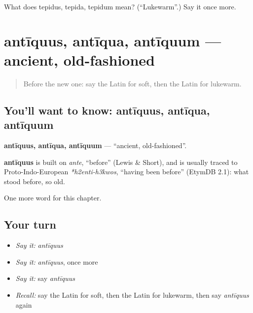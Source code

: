 \begin{tcolorbox}[breakable,colback=teal!4,colframe=teal!35!black,title={Before you move on}]
What does tepidus, tepida, tepidum mean? (\textquotedblleft{}Lukewarm\textquotedblright{}.) Say it once more.
\end{tcolorbox}
\section[antīquus, antīqua, antīquum]{antīquus, antīqua, antīquum — ancient, old-fashioned}

\label{lesson:LA-C143-antiquus}



\begin{quote}
Before the new one: say the Latin for soft, then the Latin for lukewarm.
\end{quote}

\subsection*{You'll want to know: antīquus, antīqua, antīquum}
\textbf{antīquus, antīqua, antīquum} — \textquotedblleft{}ancient, old-fashioned\textquotedblright{}.

\begin{cousinweb}
\textbf{antīquus} is built on \emph{ante}, \textquotedblleft{}before\textquotedblright{} (Lewis \& Short), and is usually traced to Proto-Indo-European \emph{*h2enti-h3kwos}, \textquotedblleft{}having been before\textquotedblright{} (EtymDB 2.1): what stood before, so old.
\end{cousinweb}

\begin{grammarlens}[title={What you've built}]
One more word for this chapter.
\end{grammarlens}

\subsection*{Your turn}
\begin{itemize}
\raggedright
  \item \emph{Say it:} \emph{antīquus}
  \item \emph{Say it:} \emph{antīquus}, once more
  \item \emph{Say it:} say \emph{antīquus}
  \item \emph{Recall:} say the Latin for soft, then the Latin for lukewarm, then say \emph{antīquus} again
\end{itemize}

